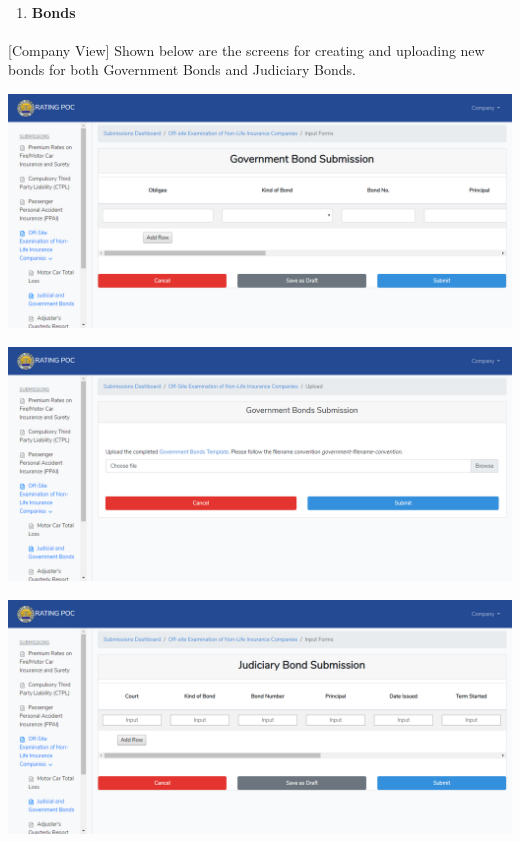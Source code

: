 \documentclass{article}
\begin{document}
\begin{enumerate}[noitemsep,topsep=\mdcompacttopsep]%

\item{}
\paragraph{Bonds}\label{sec-bonds}%
\end{enumerate}%

\noindent{}[Company View] Shown below are the screens for
creating and uploading new bonds for both Government Bonds and Judiciary
Bonds.%

\includegraphics[keepaspectratio=true]{up-ic-screens/image136}{}%

\includegraphics[keepaspectratio=true]{up-ic-screens/image123}{}%

\includegraphics[keepaspectratio=true]{up-ic-screens/image218}{}%
\end{document}
